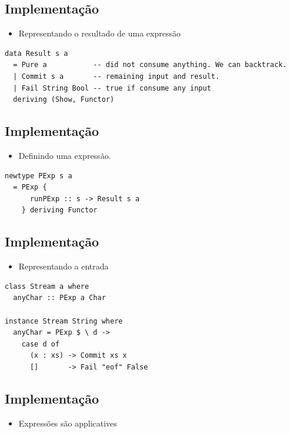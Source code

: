 \documentclass[11pt]{article}
\begin{document}
\subsection*{Implementação}
\label{sec:org2e19bf4}

\begin{itemize}
\item Representando o resultado de uma expressão
\end{itemize}

\begin{verbatim}
data Result s a
  = Pure a           -- did not consume anything. We can backtrack.
  | Commit s a       -- remaining input and result.
  | Fail String Bool -- true if consume any input
  deriving (Show, Functor)
\end{verbatim}
\subsection*{Implementação}
\label{sec:orgcda2a02}

\begin{itemize}
\item Definindo uma expressão.
\end{itemize}

\begin{verbatim}
newtype PExp s a
  = PExp {
      runPExp :: s -> Result s a
    } deriving Functor
\end{verbatim}
\subsection*{Implementação}
\label{sec:org0a96994}

\begin{itemize}
\item Representando a entrada
\end{itemize}

\begin{verbatim}
class Stream a where
  anyChar :: PExp a Char

instance Stream String where
  anyChar = PExp $ \ d ->
    case d of
      (x : xs) -> Commit xs x
      []       -> Fail "eof" False
\end{verbatim}
\subsection*{Implementação}
\label{sec:orgfdc2657}

\begin{itemize}
\item Expressões são applicatives
\end{itemize}
\end{document}
